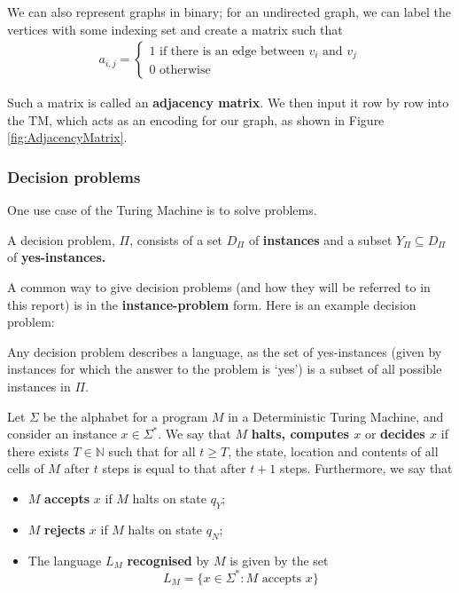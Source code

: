 We can also represent graphs in binary; for an undirected graph, we can label the vertices with some indexing set and create a matrix such that
\begin{align*}
    a_{i,j} =
    \begin{cases}
        1 \text{ if there is an edge between $v_i$ and $v_j$}\\
        0 \text{ otherwise}
    \end{cases}
\end{align*}

Such a matrix is called an \textbf{adjacency matrix}. We then input it row by row into the TM, which acts as an encoding for our graph, as shown in Figure \ref{fig:AdjacencyMatrix}.



\subsubsection{Decision problems}
One use case of the Turing Machine is to solve problems.

\begin{definition}
    A decision problem, $\Pi$, consists of a set $D_{\Pi}$ of \textbf{instances} and a subset $Y_\Pi \subseteq D_\Pi$ of \textbf{yes-instances.}
\end{definition}

A common way to give decision problems (and how they will be referred to in this report) is in the \textbf{instance-problem} form. Here is an example decision problem:


\begin{remark}\label{remark:DecisionProblem-Language}
    Any decision problem describes a language, as the set of yes-instances (given by instances for which the answer to the problem is `yes') is a subset of all possible instances in $\Pi$.
\end{remark}

\begin{definition} \label{def:Computation}
    Let $\Sigma$ be the alphabet for a program $M$ in a Deterministic Turing Machine, and consider an instance \(x \in \Sigma^*\). We say that $M$ \textbf{halts, computes $x$} or \textbf{decides $x$} if there exists $T \in \mathbb{N}$ such that for all $t\geq T$, the state, location and contents of all cells of $M$ after $t$ steps is equal to that after $t+1$ steps. Furthermore, we say that
    \begin{itemize}
        \item $M$ \textbf{accepts} $x$ if $M$ halts on state $q_Y$;
        \item $M$ \textbf{rejects} $x$ if $M$ halts on state $q_N$;
        \item The language $L_M$ \textbf{recognised} by $M$ is given by the set \[L_M = \{x \in \Sigma^*: M \text{ accepts } x\}\]
    \end{itemize}
    
\end{definition}


